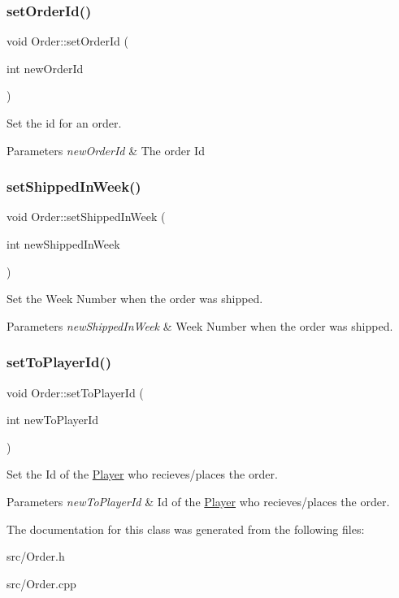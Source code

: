 \subsubsection{\texorpdfstring{set\+Order\+Id()}{setOrderId()}}
{\footnotesize\ttfamily void Order\+::set\+Order\+Id (\begin{DoxyParamCaption}\item[{int}]{new\+Order\+Id }\end{DoxyParamCaption})}

Set the id for an order. 
\begin{DoxyParams}{Parameters}
{\em new\+Order\+Id} & The order Id \\
\hline
\end{DoxyParams}
\mbox{\label{classOrder_a38114f2b7e6b6d49fb791d2b2adb7378}} 
\subsubsection{\texorpdfstring{set\+Shipped\+In\+Week()}{setShippedInWeek()}}
{\footnotesize\ttfamily void Order\+::set\+Shipped\+In\+Week (\begin{DoxyParamCaption}\item[{int}]{new\+Shipped\+In\+Week }\end{DoxyParamCaption})}

Set the Week Number when the order was shipped. 
\begin{DoxyParams}{Parameters}
{\em new\+Shipped\+In\+Week} & Week Number when the order was shipped. \\
\hline
\end{DoxyParams}
\mbox{\label{classOrder_aa4fd3b1330aec093b6022cca63e0633c}} 
\subsubsection{\texorpdfstring{set\+To\+Player\+Id()}{setToPlayerId()}}
{\footnotesize\ttfamily void Order\+::set\+To\+Player\+Id (\begin{DoxyParamCaption}\item[{int}]{new\+To\+Player\+Id }\end{DoxyParamCaption})}

Set the Id of the \hyperlink{classPlayer}{Player} who recieves/places the order. 
\begin{DoxyParams}{Parameters}
{\em new\+To\+Player\+Id} & Id of the \hyperlink{classPlayer}{Player} who recieves/places the order. \\
\hline
\end{DoxyParams}


The documentation for this class was generated from the following files\+:\begin{DoxyCompactItemize}
\item 
src/Order.\+h\item 
src/Order.\+cpp\end{DoxyCompactItemize}
